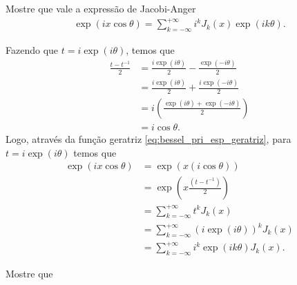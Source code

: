 \documentclass[a4paper,12pt, leqno, answers]{exam}
\begin{document}
\begin{questions}
     Mostre que vale a express\~{a}o de Jacobi-Anger
    \begin{align*}
        \exp(i x \cos \theta) = \sum_{k = -\infty}^{+\infty} i^k J_k(x) \exp(i k \theta).
    \end{align*}
    \begin{solution}
        Fazendo que $t = i \exp(i \theta)$, temos que
        \begin{align*}
            \frac{t - t^{-1}}{2} &= \frac{i \exp(i \theta)}{2} - \frac{\exp(-i \theta)}{2} \\
            &= \frac{i \exp(i \theta)}{2} + \frac{i \exp(-i \theta)}{2} \\
            &= i \left( \frac{\exp(i \theta) + \exp(-i \theta)}{2} \right) \\
            &= i \cos \theta.
        \end{align*}
        Logo, através da função geratriz \eqref{eq:bessel_pri_esp_geratriz}, para $t = i \exp(i \theta)$ temos que
        \begin{align*}
            \exp(i x \cos \theta) &= \exp(x \left(i \cos \theta \right))\\
            &= \exp\left(x \frac{\left(t-t^{-1}\right)}{2}\right) \\
           &= \sum_{k = -\infty}^{+\infty} t^k J_k(x) \\
            &= \sum_{k = -\infty}^{+\infty} (i \exp(i \theta))^k J_k(x) \\
            &= \sum_{k = -\infty}^{+\infty} i^k \exp(i k \theta) J_k(x).
        \end{align*}
    \end{solution}

     Mostre que
\end{questions}
\end{document}
